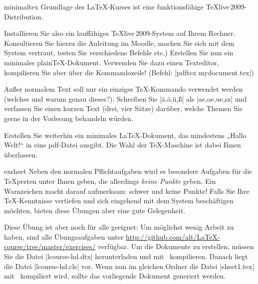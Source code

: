\documentclass[
	solution,
	blatt=1,
	ausgabe=16.\,04.\,2010,
	rückgabe=23.\,04.\,2010
]{lcourse-hd}
\begin{document}
\begin{exercise}[name=Minimales \TeX-Dokument,punkte=10,abgabe = Beide Quelltexte per Mail{,} das fertige \TeX-Dokument als Ausdruck.]{minimaltex}
Grundlage des \LaTeX-Kurses ist eine funktionsfähige \TeX live\,2009-Distribution. 

Installieren Sie also ein lauffähiges \TeX live\,2009-System auf Ihrem Rechner. Konsultieren Sie hierzu die Anleitung im Moodle, machen Sie sich mit dem System vertraut, testen Sie verschiedene Befehle etc.)
Erstellen Sie nun ein minimales plain\TeX-Dokument. Verwenden Sie dazu einen Texteditor, kompilieren Sie aber über die Kommandozeile! (Befehl: |pdftex mydocument.tex|)

Außer normalem Text soll nur ein einziges \TeX-Kommando verwendet werden (welches und warum genau dieses?). Schreiben Sie |ä,ö,ü,ß| als |ae,oe,ue,sz| und verfassen Sie einen kurzen Text (drei, vier Sätze) darüber, welche Themen Sie gerne in der Vorlesung behandeln würden.

Erstellen Sie weiterhin ein minimales \LaTeX-Dokument, das mindestens „Hallo Welt!“ in eine pdf-Datei ausgibt. Die Wahl der \TeX-Maschine ist dabei Ihnen überlassen.
\end{exercise}

\begin{expertexercise}[
	name=Übungsblätter selbst erstellen,
	abgabe = Keine Abgabe nötig.
]{exsheet}
Neben den normalen Pflichtaufgaben wird es besondere Aufgaben für die \TeX perten unter Ihnen geben, die allerdings \emph{keine Punkte} geben. Ein Warnzeichen macht darauf aufmerksam: schwer und keine Punkte! \raisebox{1ex}{\font\manualtiny=manfnt at 6pt\manualtiny\char127} Falls Sie Ihre \TeX-Kenntnisse vertiefen und sich eingehend mit dem System beschäftigen möchten, bieten diese Übungen aber eine gute Gelegenheit.

Diese Übung ist aber noch für alle geeignet: Um möglichst wenig Arbeit zu haben, sind alle Übungsaufgaben unter \url{http://github.com/alt/LaTeX-course/tree/master/exercises/} verfügbar. Um die Dokumente zu erstellen, müssen Sie die Datei |lcourse-hd.dtx| herunterladen und mit \XeLaTeX\ kompilieren. Danach liegt die Datei |lcourse-hd.cls| vor. Wenn nun im gleichen Ordner die Datei |sheet1.tex| mit \XeLaTeX\ kompiliert wird, sollte das vorliegende Dokument generiert werden.

\end{expertexercise}
\end{document}
